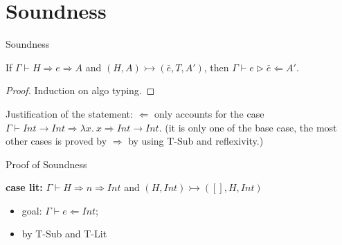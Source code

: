 \section{Soundness}

\begin{frame}{Soundness}

	\begin{lemma}[Soundness]
		If $\Gamma \vdash H \Rightarrow e \Rightarrow A$ and  $(H, A) \rightarrowtail (\bar{e}, T, A')$, then $\Gamma \vdash e \vartriangleright \bar{e} \Leftarrow A'$.
	\end{lemma}

	\begin{proof}
		Induction on   algo typing.
	\end{proof}

	\noindent\makebox[\linewidth]{\rule{0.9\paperwidth}{0.4pt}}

	Justification of the statement: $\Leftarrow$ only accounts for the case $\Gamma \vdash Int \rightarrow Int \Rightarrow \lambda x. ~x \Rightarrow Int \rightarrow Int$. (it is only one of the base case, the most other cases is proved by $\Rightarrow$ by using T-Sub and reflexivity.)

\end{frame}

\begin{frame}{Proof of Soundness}

	\textbf{case lit:} $\Gamma \vdash H \Rightarrow n \Rightarrow Int$ and $(H, Int) \rightarrowtail ([], H, Int)$
	\begin{itemize}
		\item goal: $\Gamma \vdash e \Leftarrow Int$;
		\item by T-Sub and T-Lit
	\end{itemize}

\end{frame}


